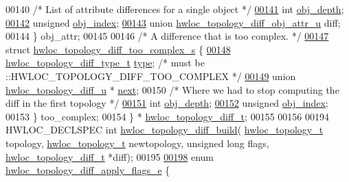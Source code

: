 \begin{DoxyCode}
00140     \textcolor{comment}{/* List of attribute differences for a single object */}
\hyperlink{a00358_a82c1d4bab80b9e0bf301a9d8291893e0}{00141}     \textcolor{keywordtype}{int} \hyperlink{a00358_a82c1d4bab80b9e0bf301a9d8291893e0}{obj\_depth};
\hyperlink{a00358_adb9f4d414470b6670cde8d90759a6c1c}{00142}     \textcolor{keywordtype}{unsigned} \hyperlink{a00358_adb9f4d414470b6670cde8d90759a6c1c}{obj\_index};
\hyperlink{a00358_a91f0645f9062e892652357cd141c8ebb}{00143}     \textcolor{keyword}{union }\hyperlink{a00334}{hwloc\_topology\_diff\_obj\_attr\_u} diff;
00144   \} obj\_attr;
00145 
00146   \textcolor{comment}{/* A difference that is too complex. */}
\hyperlink{a00362}{00147}   \textcolor{keyword}{struct }\hyperlink{a00362}{hwloc\_topology\_diff\_too\_complex\_s} \{
\hyperlink{a00362_a92084295a4d6faf17a95a7eea526ddbd}{00148}     \hyperlink{a00225_ga4b86adb00c8b2d09ebc4ef8f3bfd92b2}{hwloc\_topology\_diff\_type\_t} \hyperlink{a00362_a92084295a4d6faf17a95a7eea526ddbd}{type}; \textcolor{comment}{/* must be
       ::HWLOC\_TOPOLOGY\_DIFF\_TOO\_COMPLEX */}
\hyperlink{a00362_a375afbaa043b109be689a7d9a3c7d153}{00149}     \textcolor{keyword}{union }\hyperlink{a00350}{hwloc\_topology\_diff\_u} * \hyperlink{a00362_a375afbaa043b109be689a7d9a3c7d153}{next};
00150     \textcolor{comment}{/* Where we had to stop computing the diff in the first topology */}
\hyperlink{a00362_a94c6498caeaafbb79927395d918d6cb3}{00151}     \textcolor{keywordtype}{int} \hyperlink{a00362_a94c6498caeaafbb79927395d918d6cb3}{obj\_depth};
\hyperlink{a00362_a6dc6b3c4adb10db74d993e37afaa0580}{00152}     \textcolor{keywordtype}{unsigned} \hyperlink{a00362_a6dc6b3c4adb10db74d993e37afaa0580}{obj\_index};
00153   \} too\_complex;
00154 \} * \hyperlink{a00225_ga2cf1b17332fe5d95f2198f6340cfd288}{hwloc\_topology\_diff\_t};
00155 
00156 
00194 HWLOC\_DECLSPEC \textcolor{keywordtype}{int} \hyperlink{a00225_ga8a1754f69fbb31364ea3ea2c39827c9f}{hwloc\_topology\_diff\_build}(
      \hyperlink{a00186_ga9d1e76ee15a7dee158b786c30b6a6e38}{hwloc\_topology\_t} topology, \hyperlink{a00186_ga9d1e76ee15a7dee158b786c30b6a6e38}{hwloc\_topology\_t} newtopology, \textcolor{keywordtype}{unsigned} \textcolor{keywordtype}{long} 
      flags, \hyperlink{a00350}{hwloc\_topology\_diff\_t} *diff);
00195 
\hyperlink{a00225_gada4c1273ce020afaf02b649496f7edf5}{00198} \textcolor{keyword}{enum} \hyperlink{a00225_gada4c1273ce020afaf02b649496f7edf5}{hwloc\_topology\_diff\_apply\_flags\_e} \{

\end{DoxyCode}
